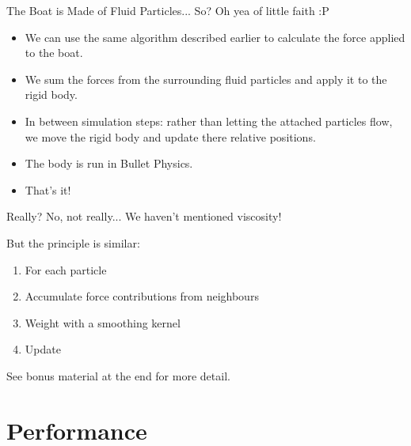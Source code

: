 \documentclass[12pt]{beamer}
\begin{document}

\begin{frame}[t]{The Boat is Made of Fluid Particles... So?}
\pause
Oh yea of little faith :P

\begin{itemize}[<+->]
\item We can use the same algorithm described earlier to calculate the force applied to the boat.
\item We sum the forces from the surrounding fluid particles and apply it to the rigid body.
\item In between simulation steps: rather than letting the attached particles flow, we move the rigid body and update there relative positions.
\item The body is run in Bullet Physics.
\item \color{green} That's it!
\end{itemize}

\end{frame}


\begin{frame}{Really?}
\pause
No, not really... \pause
We haven't mentioned viscosity! \pause
 
But the principle is similar: \pause

\begin{enumerate}
\item For each particle
\item Accumulate force contributions from neighbours
\item Weight with a smoothing kernel
\item Update
\end{enumerate}

\color{white}
See bonus material at the end for more detail.

\end{frame}


\section{Performance}

\begin{frame}
\end{frame}
\end{document}
